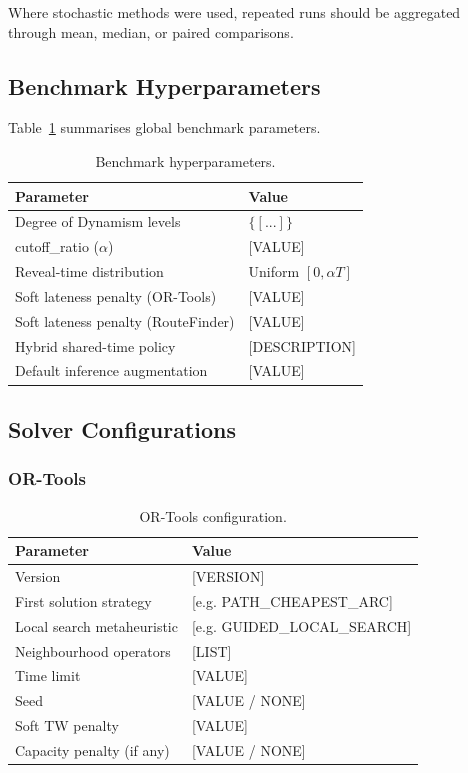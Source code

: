 Where stochastic methods were used, repeated runs should be aggregated through
mean, median, or paired comparisons.

\subsection{Benchmark Hyperparameters}

Table~\ref{tab:hyperparams} summarises global benchmark parameters.

\begin{table}[H]
\centering
\caption{Benchmark hyperparameters.}
\label{tab:hyperparams}
\begin{tabular}{ll}
\toprule
Parameter & Value \\
\midrule
Degree of Dynamism levels & $\{[...]\}$ \\
cutoff\_ratio ($\alpha$) & [VALUE] \\
Reveal-time distribution & Uniform $[0,\alpha T]$ \\
Soft lateness penalty (OR-Tools) & [VALUE] \\
Soft lateness penalty (RouteFinder) & [VALUE] \\
Hybrid shared-time policy & [DESCRIPTION] \\
Default inference augmentation & [VALUE] \\
\bottomrule
\end{tabular}
\end{table}

\subsection{Solver Configurations}

\subsubsection*{OR-Tools}

\begin{table}[H]
\centering
\caption{OR-Tools configuration.}
\label{tab:ortools}
\begin{tabular}{ll}
\toprule
Parameter & Value \\
\midrule
Version & [VERSION] \\
First solution strategy & [e.g. PATH\_CHEAPEST\_ARC] \\
Local search metaheuristic & [e.g. GUIDED\_LOCAL\_SEARCH] \\
Neighbourhood operators & [LIST] \\
Time limit & [VALUE] \\
Seed & [VALUE / NONE] \\
Soft TW penalty & [VALUE] \\
Capacity penalty (if any) & [VALUE / NONE] \\
\bottomrule
\end{tabular}
\end{table}

